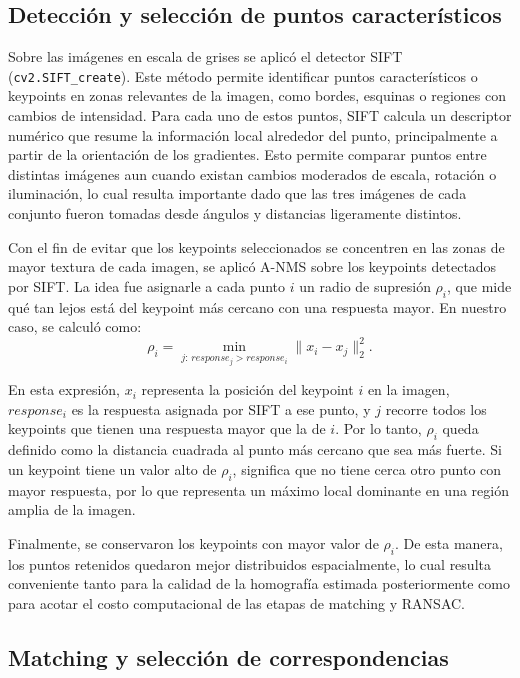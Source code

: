 \documentclass[a4paper,11pt]{article}
\begin{document}
\subsection*{Detección y selección de puntos característicos}

Sobre las imágenes en escala de grises se aplicó el detector SIFT (\texttt{cv2.SIFT\_create}). Este método permite identificar puntos característicos o keypoints en zonas relevantes de la imagen, como bordes, esquinas o regiones con cambios de intensidad. Para cada uno de estos puntos, SIFT calcula un descriptor numérico que resume la información local alrededor del punto, principalmente a partir de la orientación de los gradientes. Esto permite comparar puntos entre distintas imágenes aun cuando existan cambios moderados de escala, rotación o iluminación, lo cual resulta importante dado que las tres imágenes de cada conjunto fueron tomadas desde ángulos y distancias ligeramente distintos.

Con el fin de evitar que los keypoints seleccionados se concentren en las zonas de mayor textura de cada imagen, se aplicó A-NMS sobre los keypoints detectados por SIFT. La idea fue asignarle a cada punto \(i\) un radio de supresión \(\rho_i\), que mide qué tan lejos está del keypoint más cercano con una respuesta mayor. En nuestro caso, se calculó como:
\[
\rho_i = \min_{j:\, response_j > response_i} \|x_i - x_j\|_2^2.
\]

En esta expresión, \(x_i\) representa la posición del keypoint \(i\) en la imagen, \(response_i\) es la respuesta asignada por SIFT a ese punto, y \(j\) recorre todos los keypoints que tienen una respuesta mayor que la de \(i\). Por lo tanto, \(\rho_i\) queda definido como la distancia cuadrada al punto más cercano que sea más fuerte. Si un keypoint tiene un valor alto de \(\rho_i\), significa que no tiene cerca otro punto con mayor respuesta, por lo que representa un máximo local dominante en una región amplia de la imagen.

Finalmente, se conservaron los keypoints con mayor valor de \(\rho_i\). De esta manera, los puntos retenidos quedaron mejor distribuidos espacialmente, lo cual resulta conveniente tanto para la calidad de la homografía estimada posteriormente como para acotar el costo computacional de las etapas de matching y RANSAC.

\subsection*{Matching y selección de correspondencias}
\end{document}
